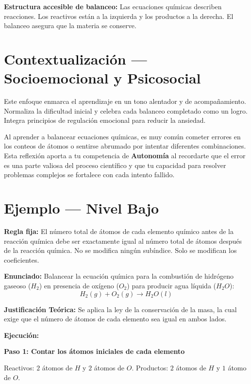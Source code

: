 \documentclass[
  spanish,
  letterpaper,
  12pt,
  oneside,
  open=any]{scrbook}
\newcommand{\setcolorsection}[2]{%
  \definecolor{currentsectionbg}{HTML}{#1}%
  \definecolor{currentsectionborder}{HTML}{#2}%
}
\begin{document}
\textbf{Estructura accesible de balanceo:} Las ecuaciones químicas
describen reacciones. Los reactivos están a la izquierda y los productos
a la derecha. El balanceo asegura que la materia se conserve.

\setcolorsection{d6c7e7}{c0b0d8}

\section{Contextualización --- Socioemocional y
Psicosocial}\label{contextualizaciuxf3n-socioemocional-y-psicosocial}

Este enfoque enmarca el aprendizaje en un tono alentador y de
acompañamiento. Normaliza la dificultad inicial y celebra cada balanceo
completado como un logro. Integra principios de regulación emocional
para reducir la ansiedad.

Al aprender a balancear ecuaciones químicas, es muy común cometer
errores en los conteos de átomos o sentirse abrumado por intentar
diferentes combinaciones. Esta reflexión aporta a tu competencia de
\textbf{Autonomía} al recordarte que el error es una parte valiosa del
proceso científico y que tu capacidad para resolver problemas complejos
se fortalece con cada intento fallido.

\setcolorsection{b3d9f0}{94c4e0}

\section{Ejemplo --- Nivel Bajo}\label{ejemplo-nivel-bajo-1}

\textbf{Regla fija:} El número total de átomos de cada elemento químico
antes de la reacción química debe ser exactamente igual al número total
de átomos después de la reacción química. No se modifica ningún
subíndice. Solo se modifican los coeficientes.

\textbf{Enunciado:} Balancear la ecuación química para la combustión de
hidrógeno gaseoso (\(H_2\)) en presencia de oxígeno (\(O_2\)) para
producir agua líquida (\(H_2O\)):
\[H_2(g) + O_2(g) \rightarrow H_2O(l)\]

\textbf{Justificación Teórica:} Se aplica la ley de la conservación de
la masa, la cual exige que el número de átomos de cada elemento sea
igual en ambos lados.

\textbf{Ejecución:}

\textbf{Paso 1: Contar los átomos iniciales de cada elemento}

Reactivos: \(2\) átomos de \(H\) y \(2\) átomos de \(O\). Productos:
\(2\) átomos de \(H\) y \(1\) átomo de \(O\).
\end{document}
